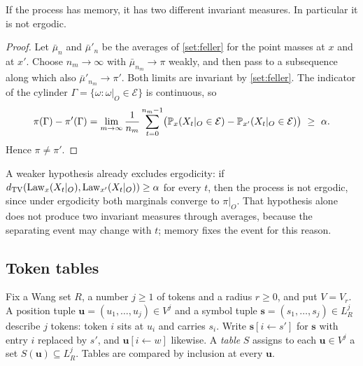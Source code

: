 \begin{lemma}\label{set:memory-nonergodic}
If the process has memory, it has two different invariant measures. In particular it is not ergodic.
\end{lemma}

\begin{proof}
Let $\bar\mu_n$ and $\bar\mu'_n$ be the averages of \cref{set:feller} for the point masses at $x$ and at $x'$. Choose $n_m\to\infty$ with $\bar\mu_{n_m}\to\pi$ weakly, and then pass to a subsequence along which also $\bar\mu'_{n_m}\to\pi'$. Both limits are invariant by \cref{set:feller}. The indicator of the cylinder $\Gamma=\{\omega:\omega|_O\in\mathcal E\}$ is continuous, so
\[
\pi(\Gamma)-\pi'(\Gamma)=\lim_{m\to\infty}\frac1{n_m}\sum_{t=0}^{n_m-1}\bigl(\mathbb{P}_x(X_t|_O\in\mathcal E)-\mathbb{P}_{x'}(X_t|_O\in\mathcal E)\bigr)\ \ge\ \alpha .
\]
Hence $\pi\ne\pi'$.
\end{proof}

A weaker hypothesis already excludes ergodicity: if $d_{\mathrm{TV}}(\mathrm{Law}_x(X_t|_O),\mathrm{Law}_{x'}(X_t|_O))\ge\alpha$ for every $t$, then the process is not ergodic, since under ergodicity both marginals converge to $\pi|_O$. That hypothesis alone does not produce two invariant measures through averages, because the separating event may change with $t$; memory fixes the event for this reason.

\subsection{Token tables}\label{set:sub-tables}

Fix a Wang set $R$, a number $j\ge1$ of tokens and a radius $r\ge0$, and put $V=V_r$. A position tuple $\mathbf u=(u_1,\dots,u_j)\in V^j$ and a symbol tuple $\mathbf s=(s_1,\dots,s_j)\in L_R^j$ describe $j$ tokens: token $i$ sits at $u_i$ and carries $s_i$. Write $\mathbf s[i\leftarrow s']$ for $\mathbf s$ with entry $i$ replaced by $s'$, and $\mathbf u[i\leftarrow w]$ likewise. A \emph{table} $S$ assigns to each $\mathbf u\in V^j$ a set $S(\mathbf u)\subseteq L_R^j$. Tables are compared by inclusion at every $\mathbf u$.

